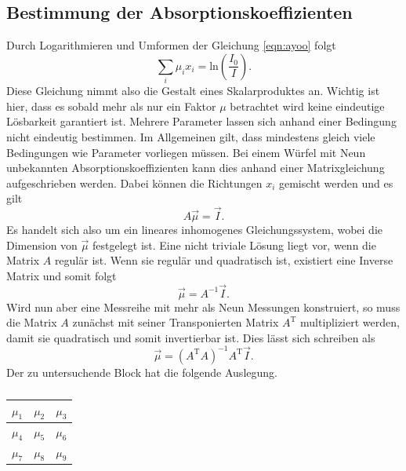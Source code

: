 \subsection{Bestimmung der Absorptionskoeffizienten}
Durch Logarithmieren und Umformen der Gleichung \eqref{eqn:ayoo} folgt
\begin{equation}
    \label{eqn:hierlol}
\sum_{i}^{} \mu_i x_i = \text{ln}\left(\frac{I_0}{I}\right).
\end{equation}
Diese Gleichung nimmt also die Gestalt eines Skalarproduktes an. Wichtig ist hier, dass es sobald mehr als nur ein Faktor $\mu$ betrachtet wird keine eindeutige Lösbarkeit garantiert ist. Mehrere Parameter lassen sich anhand einer Bedingung
nicht eindeutig bestimmen. Im Allgemeinen gilt, dass mindestens gleich viele Bedingungen wie Parameter vorliegen müssen. Bei einem Würfel mit Neun unbekannten Absorptionskoeffizienten kann dies anhand einer Matrixgleichung aufgeschrieben werden.
Dabei können die Richtungen $x_i$ gemischt werden und es gilt
\begin{equation}
A \vec{\mu} = \vec{I}.
\end{equation}
Es handelt sich also um ein lineares inhomogenes Gleichungssystem, wobei die Dimension von $\vec{\mu}$ festgelegt ist. Eine nicht triviale Lösung liegt vor, wenn die Matrix $A$ regulär ist. Wenn sie regulär und quadratisch ist, existiert
eine Inverse Matrix und somit folgt
\begin{equation}
\vec{\mu} = A^{-1}\vec{I}.
\end{equation}
Wird nun aber eine Messreihe mit mehr als Neun Messungen konstruiert, so muss die Matrix $A$ zunächst mit seiner Transponierten Matrix $A^{\text{T}}$ multipliziert werden, damit sie quadratisch und somit invertierbar ist. 
Dies lässt sich schreiben als 
\begin{equation}
\vec{\mu} = (A^{\text{T}}A)^{-1} A^{\text{T}} \vec{I}.
\end{equation}
Der zu untersuchende Block hat die folgende Auslegung.
\begin{table}
    \centering
    \caption*{} 
    \label{tab:3}
    \begin{tabular}{c | c | c}
        $\mu_1$ & $\mu_2$ & $\mu_3$ \\
        \midrule
        $\mu_4$ & $\mu_5$ & $\mu_6$  \\
        \midrule
        $\mu_7$ & $\mu_8$ & $\mu_9$  \\
    \end{tabular}
\end{table}
